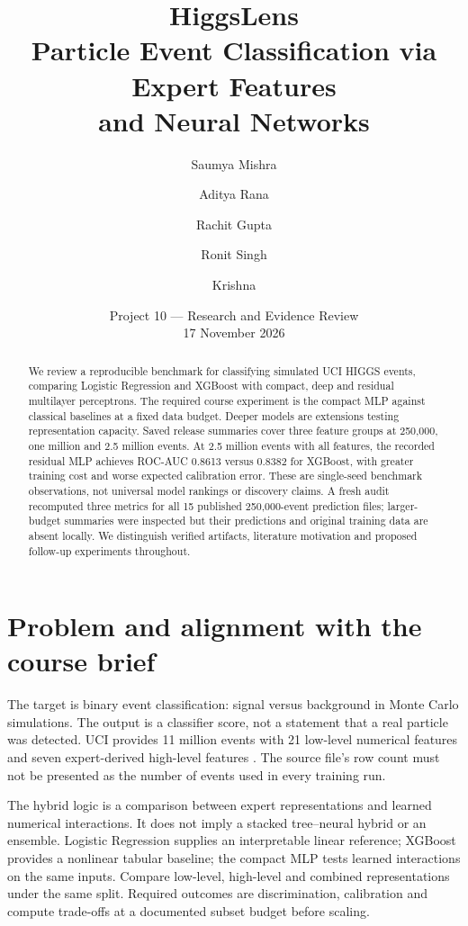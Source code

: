 \documentclass[11pt,a4paper]{article}
\title{\textbf{HiggsLens}\\Particle Event Classification via Expert Features\\and Neural Networks}
\author{Saumya Mishra \and Aditya Rana \and Rachit Gupta \and Ronit Singh \and Krishna}
\date{Project 10 --- Research and Evidence Review\\17 November 2026}
\begin{document}
\maketitle
\begin{abstract}
We review a reproducible benchmark for classifying simulated UCI HIGGS events, comparing Logistic Regression and XGBoost with compact, deep and residual multilayer perceptrons. The required course experiment is the compact MLP against classical baselines at a fixed data budget. Deeper models are extensions testing representation capacity. Saved release summaries cover three feature groups at 250,000, one million and 2.5 million events. At 2.5 million events with all features, the recorded residual MLP achieves ROC-AUC 0.8613 versus 0.8382 for XGBoost, with greater training cost and worse expected calibration error. These are single-seed benchmark observations, not universal model rankings or discovery claims. A fresh audit recomputed three metrics for all 15 published 250,000-event prediction files; larger-budget summaries were inspected but their predictions and original training data are absent locally. We distinguish verified artifacts, literature motivation and proposed follow-up experiments throughout.
\end{abstract}
\begingroup\small\setlength{\parskip}{0pt}\tableofcontents\endgroup
\newpage
\section{Problem and alignment with the course brief}
The target is binary event classification: signal versus background in Monte Carlo simulations. The output is a classifier score, not a statement that a real particle was detected. UCI provides 11 million events with 21 low-level numerical features and seven expert-derived high-level features \cite{uci,baldi}. The source file's row count must not be presented as the number of events used in every training run.

The hybrid logic is a comparison between expert representations and learned numerical interactions. It does not imply a stacked tree--neural hybrid or an ensemble. Logistic Regression supplies an interpretable linear reference; XGBoost provides a nonlinear tabular baseline; the compact MLP tests learned interactions on the same inputs. Compare low-level, high-level and combined representations under the same split. Required outcomes are discrimination, calibration and compute trade-offs at a documented subset budget before scaling.
\end{document}
